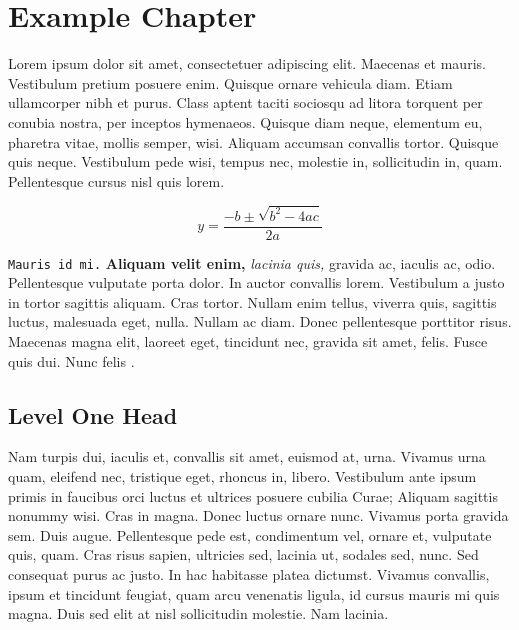 \chapter{Example Chapter}%
 \label{ch1}



Lorem ipsum dolor sit amet, consectetuer adipiscing elit.
Maecenas et mauris. Vestibulum pretium posuere enim. Quisque
ornare vehicula diam. Etiam ullamcorper nibh et purus. Class
aptent taciti sociosqu ad litora torquent per conubia nostra, per
inceptos hymenaeos. Quisque diam neque, elementum eu, pharetra
vitae, mollis semper, wisi. Aliquam accumsan convallis tortor.
Quisque quis neque. Vestibulum pede wisi, tempus nec, molestie
in, sollicitudin in, quam. Pellentesque cursus nisl quis lorem.

\[
y = \frac{-b \pm \sqrt{b^2 - 4ac}}{2a}
\]

\texttt{Mauris id mi.} \textbf{Aliquam velit enim,} \emph{lacinia
quis,} gravida ac, iaculis ac, odio. Pellentesque vulputate porta
dolor. In auctor convallis lorem. Vestibulum a justo in tortor
sagittis aliquam. Cras tortor. Nullam enim tellus, viverra quis,
sagittis luctus, malesuada eget, nulla. Nullam ac diam. Donec
pellentesque porttitor risus. Maecenas magna elit, laoreet eget,
tincidunt nec, gravida sit amet, felis. Fusce quis dui. Nunc felis \cite{doe:2004,doe:1994,hunt:1975}.

\section{Level One Head}

Nam turpis dui, iaculis et, convallis sit amet, euismod at, urna.
Vivamus urna quam, eleifend nec, tristique eget, rhoncus in,
libero. Vestibulum ante ipsum primis in faucibus orci luctus et
ultrices posuere cubilia Curae; Aliquam sagittis nonummy wisi.
Cras in magna. Donec luctus ornare nunc. Vivamus porta gravida
sem. Duis augue. Pellentesque pede est, condimentum vel, ornare
et, vulputate quis, quam. Cras risus sapien, ultricies sed,
lacinia ut, sodales sed, nunc. Sed consequat purus ac justo. In
hac habitasse platea dictumst. Vivamus convallis, ipsum et
tincidunt feugiat, quam arcu venenatis ligula, id cursus mauris
mi quis magna. Duis sed elit at nisl sollicitudin molestie. Nam
lacinia.

